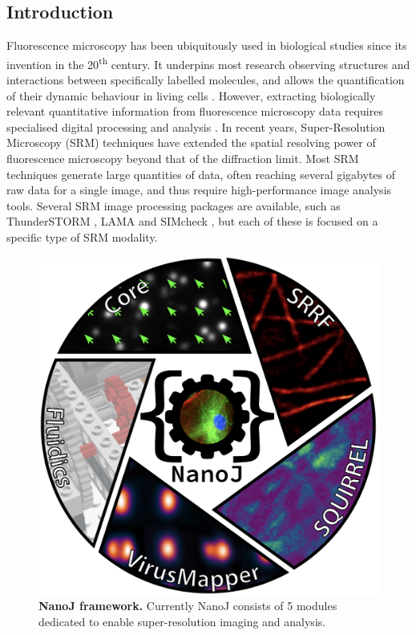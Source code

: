 \subsection*{Introduction}
Fluorescence microscopy has been ubiquitously used in biological studies since its invention in the 20\textsuperscript{th} century. It underpins most research observing structures and interactions between specifically labelled molecules, and allows the quantification of their dynamic behaviour in living cells \cite{rino2009frontiers}. However, extracting biologically relevant quantitative information from fluorescence microscopy data requires specialised digital processing and analysis \cite{wheeler2017standard}. In recent years, Super-Resolution Microscopy (SRM) techniques \cite{betzig2006imaging,rust2006sub,hell1994breaking} have extended the spatial resolving power of fluorescence microscopy beyond that of the diffraction limit. Most SRM techniques generate large quantities of data, often reaching several gigabytes of raw data for a single image, and thus require high-performance image analysis tools.  Several SRM image processing packages are available, such as ThunderSTORM \cite{ovesny2014thunderstorm}, LAMA \cite{Malkusch2016LAMA} and SIMcheck \cite{schermelleh2015simcheck}, but each of these is focused on a specific type of SRM modality.
  
 \begin{figure}[!t]
    \centering
    \includegraphics[width=\linewidth]{Figures/FigureMain_v3.png}
    \caption{\textbf{NanoJ framework.} Currently NanoJ consists of 5 modules dedicated to enable super-resolution imaging and analysis.}
    \label{fig:GeneralDiagram}
 \end{figure}
 
